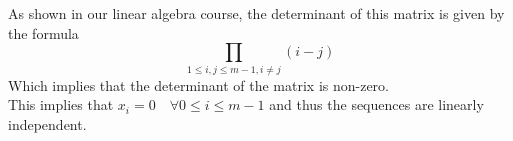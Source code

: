 \documentclass[11pt, a4paper]{article}
\begin{document}
As shown in our linear algebra course, the determinant of this matrix is given by the formula
\[ 
	\prod_{1\leq i,j \leq m-1, i \neq j} ( i-j) 
\]
Which implies that the determinant of the matrix is non-zero.\\
This implies that $x_i = 0 \quad \forall 0\leq i \leq m-1$ and thus the sequences are linearly independent.













\end{document}
